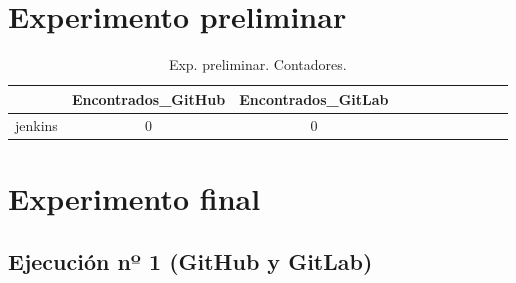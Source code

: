 \section{Experimento preliminar}

\begin{table}[h]
  \centering
  \caption{Exp. preliminar. Contadores.}
  \label{tab:tabla_p_1}

\begin{footnotesize}
\renewcommand{\arraystretch}{1.5} %
\begin{tabular}{ccccccccccc}
  \hline
  {} &  Encontrados\_GitHub &  Encontrados\_GitLab \\
  \hline
  jenkins         &                   0 &                   0 \\
 \end{tabular}
\end{footnotesize}

\end{table}

\section{Experimento final}



\subsection{Ejecución nº 1 (GitHub y GitLab)}

